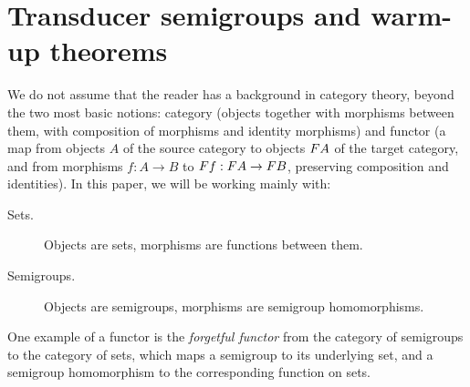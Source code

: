 \section{Transducer semigroups and warm-up theorems}
We do not assume that the reader has a background in category theory, beyond the two most basic notions: category (objects together with morphisms between them, with composition of morphisms and identity morphisms) and functor (a map from objects $A$ of the source category to objects $\functor A$ of the target category, and from morphisms $f : A \to B$ to $\functor f : \functor A \to \functor B$, preserving composition and identities). In this paper, we will be working mainly with:
\begin{description}
    \item[Sets.] Objects are sets,  morphisms are functions between them.
    \item[Semigroups.] Objects are semigroups,  morphisms are semigroup homomorphisms.
\end{description}

One example of a functor is the \emph{forgetful functor} from the category of semigroups to the category of sets, which maps a semigroup to its underlying set, and a semigroup homomorphism to the corresponding function on sets. 

